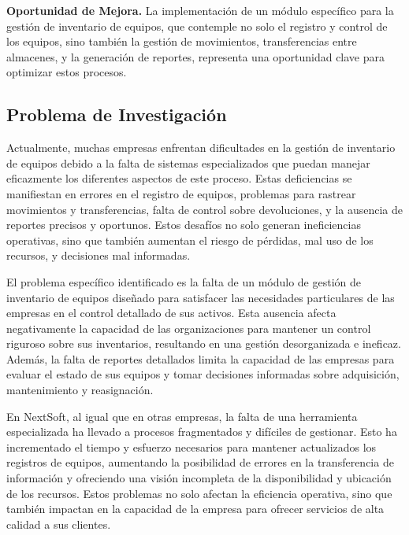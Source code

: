 \documentclass[stu, 12pt, letterpaper, donotrepeattitle, floatsintext, natbib]{apa7}
\begin{document}
\textbf{Oportunidad de Mejora. }La implementación de un módulo específico para la gestión de inventario de equipos, que contemple no solo el
registro y control de los equipos, sino también la gestión de movimientos, transferencias entre almacenes, y la generación de reportes,
representa una oportunidad clave para optimizar estos procesos.

\subsection{Problema de Investigación}
Actualmente, muchas empresas enfrentan dificultades en la gestión de inventario de equipos debido a la falta de sistemas especializados que
puedan manejar eficazmente los diferentes aspectos de este proceso. Estas deficiencias se manifiestan en errores en el registro de equipos,
problemas para rastrear movimientos y transferencias, falta de control sobre devoluciones, y la ausencia de reportes precisos y oportunos.
Estos desafíos no solo generan ineficiencias operativas, sino que también aumentan el riesgo de pérdidas, mal uso de los recursos, y
decisiones mal informadas.

El problema específico identificado es la falta de un módulo de gestión de inventario de equipos diseñado para satisfacer las necesidades
particulares de las empresas en el control detallado de sus activos. Esta ausencia afecta negativamente la capacidad de las organizaciones
para mantener un control riguroso sobre sus inventarios, resultando en una gestión desorganizada e ineficaz. Además, la falta de reportes
detallados limita la capacidad de las empresas para evaluar el estado de sus equipos y tomar decisiones informadas sobre adquisición,
mantenimiento y reasignación.

En NextSoft, al igual que en otras empresas, la falta de una herramienta especializada ha llevado a procesos fragmentados y difíciles de
gestionar. Esto ha incrementado el tiempo y esfuerzo necesarios para mantener actualizados los registros de equipos, aumentando la posibilidad
de errores en la transferencia de información y ofreciendo una visión incompleta de la disponibilidad y ubicación de los recursos. Estos
problemas no solo afectan la eficiencia operativa, sino que también impactan en la capacidad de la empresa para ofrecer servicios de alta
calidad a sus clientes.
\end{document}
